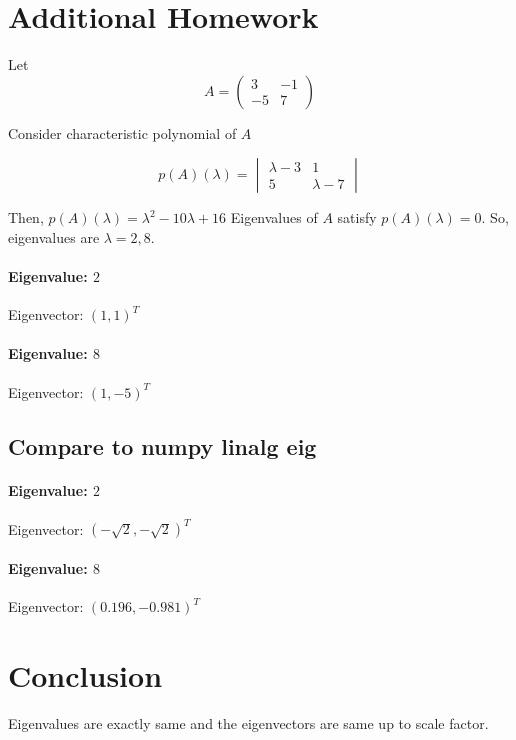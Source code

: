 \documentclass{article}
\begin{document}
\section{Additional Homework}

Let 
$$
A = \begin{pmatrix}
3 & -1 \\
-5 & 7
\end{pmatrix}
$$

Consider characteristic polynomial of $A$

$$
p(A)(\lambda) = \begin{vmatrix}
\lambda -3 & 1 \\
5 & \lambda -7
\end{vmatrix}
$$

Then, $p(A)(\lambda) = \lambda^2 - 10\lambda + 16$
Eigenvalues of $A$ satisfy $p(A)(\lambda)=0$. So, eigenvalues are 
$\lambda=2,8.$

\paragraph{Eigenvalue: $2$}
  Eigenvector: $(1,1)^T$
  
\paragraph{Eigenvalue: $8$}
  Eigenvector: $(1,-5)^T$

\subsection{Compare to numpy linalg eig}

\paragraph{Eigenvalue: $2$}
  Eigenvector: $(-\sqrt{2}, -\sqrt{2})^T$

\paragraph{Eigenvalue: $8$}
  Eigenvector: $(0.196, -0.981)^T$

\section{Conclusion}
Eigenvalues are exactly same and the eigenvectors are same up to scale factor.
\end{document}
